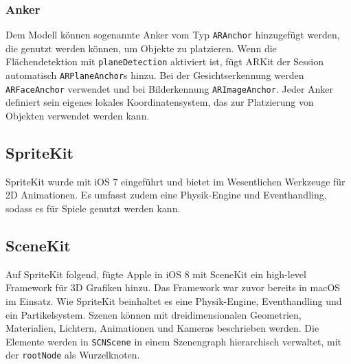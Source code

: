 
\subsubsection{Anker}
Dem Modell können sogenannte Anker vom Typ \texttt{ARAnchor} hinzugefügt werden, die genutzt werden können, um Objekte zu platzieren. Wenn die Flächendetektion mit \texttt{planeDetection} aktiviert ist, fügt ARKit der Session automatisch \texttt{ARPlaneAnchor}s hinzu. Bei der Gesichtserkennung werden \texttt{ARFaceAnchor} verwendet und bei Bilderkennung \texttt{ARImageAnchor}. Jeder Anker definiert sein eigenes lokales Koordinatensystem, das zur Platzierung von Objekten verwendet werden kann.


\subsection{SpriteKit}
SpriteKit wurde mit iOS 7 eingeführt und bietet im Wesentlichen Werkzeuge für 2D Animationen. Es umfasst zudem eine Physik-Engine und Eventhandling, sodass es für Spiele genutzt werden kann.


\subsection{SceneKit}
Auf SpriteKit folgend, fügte Apple in iOS 8 mit SceneKit ein high-level Framework für 3D Grafiken hinzu. Das Framework war zuvor bereits in macOS im Einsatz. Wie SpriteKit beinhaltet es eine Physik-Engine, Eventhandling und ein Partikelsystem. Szenen können mit dreidimensionalen Geometrien, Materialien, Lichtern, Animationen und Kameras beschrieben werden. Die Elemente werden in \texttt{SCNScene} in einem Szenengraph hierarchisch verwaltet, mit der \texttt{rootNode} als Wurzelknoten.
